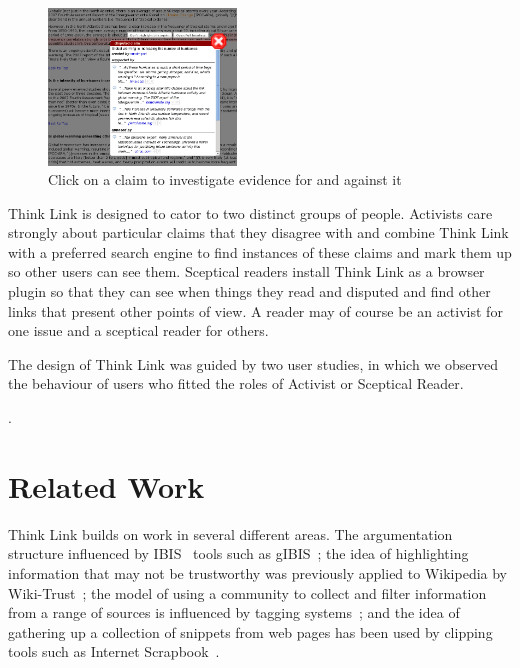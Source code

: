 \documentclass{chi2009}
\newcommand{\todo}[1]{}
\begin{document}
\begin{figure}[tb]
	\begin{center}
	\includegraphics[width=5cm]{../screenshots/v2_popup_dim.png}
	\caption{Click on a claim to investigate evidence for and against it}
	\label{claimview}
	\end{center}
\end{figure}

\todo{Claim panel should have 'more' buttons}

Think Link is designed to cator to two distinct groups of people. Activists care strongly about particular claims that they disagree with and combine Think Link with a preferred search engine to find instances of these claims and mark them up so other users can see them. Sceptical readers install Think Link as a browser plugin so that they can see when things they read and disputed and find other links that present other points of view. A reader may of course be an activist for one issue and a sceptical reader for others.

The design of Think Link was guided by two user studies, in which we observed the behaviour of users who fitted the roles of Activist or Sceptical Reader. 

\todo{Talk about automatically including all arguments from snopes}.





\section{Related Work}
\todo{Don't cite things that aren't relevant}

Think Link builds on work in several different areas. The argumentation structure influenced by IBIS~\cite{Rittel1973} tools such as gIBIS~\cite{Conklin1987a}; the idea of highlighting information that may not be trustworthy was previously applied to Wikipedia by Wiki-Trust~\cite{Adler2008}; the model of using a community to collect and filter information from a range of sources is influenced by tagging systems~\cite{Marlow2006}; and the idea of gathering up a collection of snippets from web pages has been used by clipping tools such as Internet Scrapbook~\cite{Sugiura1998}. 
\end{document}
